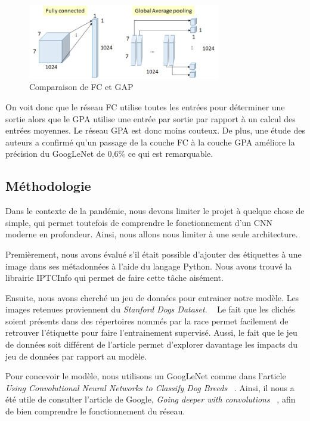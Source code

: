 \documentclass{article}
\begin{document}
\begin{figure}[htbp]
    \includegraphics[width=8.4cm]{./figures/Figure4.png} 
    \caption{Comparaison de FC et GAP}
    \label{7} 
\end{figure} 

On voit donc que le réseau FC utilise toutes les entrées pour déterminer une
sortie alors que le GPA utilise une entrée par sortie par rapport à un calcul 
des entrées moyennes. Le réseau GPA est donc moins couteux. De plus, une étude
des auteurs a confirmé qu'un passage de la couche FC à la couche GPA améliore la
précision du GoogLeNet de 0,6\% ce qui est remarquable. ~\cite{tsang_2018}

\subsection{Méthodologie}
Dans le contexte de la pandémie, nous devons limiter le projet à quelque chose 
de simple, qui permet toutefois de comprendre le fonctionnement d'un CNN 
moderne en profondeur. Ainsi, nous allons nous limiter à une seule architecture.

Premièrement, nous avons évalué s'il était possible d'ajouter des étiquettes à une
image dans ses métadonnées à l'aide du langage Python. Nous avons trouvé la
librairie IPTCInfo qui permet de faire cette tâche aisément.

Ensuite, nous avons cherché un jeu de données pour entrainer notre modèle. Les
images retenues proviennent du \textit{Stanford Dogs Dataset}. 
~\cite{KhoslaYaoJayadevaprakashFeiFei_FGVC2011} Le fait que les clichés soient
présents dans des répertoires nommés par la race permet facilement de retrouver
l'étiquette pour faire l'entrainement supervisé. Aussi, le fait que le jeu de
données soit différent de l'article permet d'explorer davantage les impacts du
jeu de données  par rapport au modèle.

Pour concevoir le modèle, nous utilisons un GoogLeNet comme dans l'article 
\textit{Using Convolutional Neural Networks to Classify Dog Breeds} 
~\cite{output}. Ainsi, il nous a été utile de consulter l'article de Google,
\textit{Going deeper with convolutions} ~\cite{43022}, afin de bien comprendre
le fonctionnement du réseau.
\end{document}
